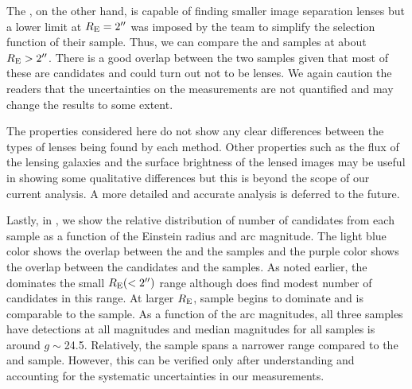 \documentclass[useAMS,usenatbib,a4paper]{mn2e}
\begin{document}
The \af, on the other hand, is capable of finding smaller image
separation lenses but a lower limit at $R_{\rm E}=2\hbox{$^{\prime\prime}$}$ was imposed
by the \af team to simplify the selection function of their sample.
Thus, we can compare the \sw and \af samples at about $R_{\rm
E}>2\hbox{$^{\prime\prime}$}$. There is a good overlap between the two samples given that
most of these are candidates and could turn out not to be lenses. We again
caution the readers that the uncertainties on the measurements are not
quantified and may change the results to some extent.

The properties considered here do not show any clear differences between
the types of lenses being found by each method. Other properties such as
the flux of the lensing galaxies and the surface brightness of the
lensed images may be useful in showing some qualitative differences but
this is beyond the scope of our current analysis. A more detailed and
accurate analysis is deferred to the future.

Lastly, in , we show the relative distribution of
number of candidates from each sample as a function of the Einstein
radius and arc magnitude. The light blue color shows the overlap between
the \sw and the \rf samples and the purple color shows the overlap
between the \sw candidates and the \af samples. As noted earlier, the
\rf dominates the small $R_{\rm E} (<2\hbox{$^{\prime\prime}$})$ range although \sw does
find modest number of candidates in this range. At larger $R_{\rm E}$,
\sw sample begins to dominate and is comparable to the \af sample.  As a
function of the arc magnitudes, all three samples have detections at all
magnitudes and median magnitudes for all samples is around $g\sim$24.5.
Relatively, the \rf sample spans a narrower range compared to the \sw
and \af sample. However, this can be verified only after understanding
and accounting for the systematic uncertainties in our measurements.
\end{document}
